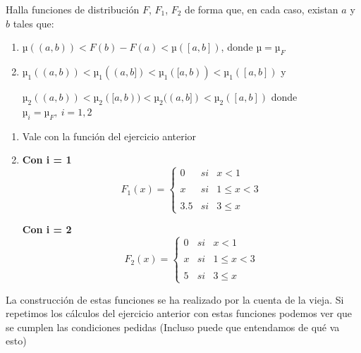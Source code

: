 \begin{problem}
Halla funciones de distribución $F$, $F_1$, $F_2$ de forma que, en cada caso, existan $a$ y $b$ tales que:
\begin{enumerate}
\item $µ((a,b)) < F(b)-F(a) < µ([a,b])$, donde $µ=µ_F$
\item $µ_1((a,b)) < µ_1((a,b]) < µ_1([a,b)) < µ_1([a,b])$ y

$µ_2((a,b)) < µ_2([a,b)) < µ_2((a,b]) < µ_2([a,b])$ donde $µ_i = µ_F, \ i=1,2$
\end{enumerate}
\solution
\begin{enumerate}
\item Vale con la función del ejercicio anterior
\item
\textbf{Con i = 1}
\[F_1(x)=\left\{ \begin{array}{lcc}
             0 &   si  & x < 1 \\
             \\ x & si & 1 \leq x < 3 \\
             \\ 3.5 &  si  & 3 \leq x
             \end{array}
   \right.\]

\textbf{Con i = 2}
\[F_2(x)=\left\{ \begin{array}{lcc}
             0 &   si  & x < 1 \\
             \\ x & si & 1 \leq x < 3 \\
             \\ 5 &  si  & 3 \leq x
             \end{array}
   \right.\]
\end{enumerate}

La construcción de estas funciones se ha realizado por la cuenta de la vieja. Si repetimos los cálculos del ejercicio anterior con estas funciones podemos ver que se cumplen las condiciones pedidas (Incluso puede que entendamos de qué va esto)
\end{problem}

